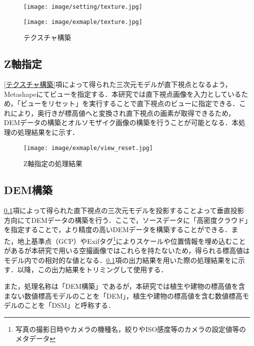       \begin{figure}[tbp]
        \begin{minipage}[c]{0.45\hsize}
          \centering
          \texttt{[image: image/setting/texture.jpg]}
        \end{minipage}
        \begin{minipage}[c]{0.45\hsize}
          \centering
          \texttt{[image: image/exmaple/texture.jpg]}
        \end{minipage}
        \caption{テクスチャ構築}
        \label{テクスチャ構築結果}
      \end{figure}


    \subsection{Z軸指定}
      \label{Z軸指定}
      \ref{テクスチャ構築}項によって得られた三次元モデルが直下視点となるよう，Metashapeにてビューを指定する．本研究では直下視点画像を入力としているため，「ビューをリセット」を実行することで直下視点のビューに指定できる．これにより，奥行きが標高値へと変換され直下視点の画素が取得できるため，DEMデータの構築とオルソモザイク画像の構築を行うことが可能となる．本処理の処理結果をに示す．

      \begin{figure}[tbp]
        \centering
        \texttt{[image: image/exmaple/view\_reset.jpg]}
        \caption{Z軸指定の処理結果}
        \label{Z軸指定結果}
      \end{figure}


    \subsection{DEM構築}
      \label{DEM構築}
      \ref{Z軸指定}項によって得られた直下視点の三次元モデルを投影することよって垂直投影方向にてDEMデータの構築を行う．ここで，ソースデータに「高密度クラウド」を指定することで，より精度の高いDEMデータを構築することができる．また，地上基準点（GCP）やExifタグ\footnote{写真の撮影日時やカメラの機種名，絞りやISO感度等のカメラの設定値等のメタデータ}によりスケールや位置情報を埋め込むことがあるが本研究で用いる空撮画像ではこれらを持たないため，得られる標高値はモデル内での相対的な値となる．\ref{Z軸指定}項の出力結果を用いた際の処理結果をに示す．以降，この出力結果をトリミングして使用する．

      また，処理名称は「DEM構築」であるが，本研究では植生や建物の標高値を含まない数値標高モデルのことを「DEM」，植生や建物の標高値を含む数値標高モデルのことを「DSM」と呼称する．

